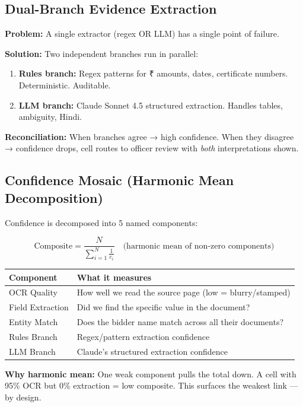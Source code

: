 \documentclass[11pt,a4paper]{article}
\begin{document}
\subsection{Dual-Branch Evidence Extraction}

\textbf{Problem:} A single extractor (regex OR LLM) has a single point of failure.

\textbf{Solution:} Two independent branches run in parallel:
\begin{enumerate}[nosep]
    \item \textbf{Rules branch:} Regex patterns for ₹ amounts, dates, certificate numbers. Deterministic. Auditable.
    \item \textbf{LLM branch:} Claude Sonnet 4.5 structured extraction. Handles tables, ambiguity, Hindi.
\end{enumerate}

\textbf{Reconciliation:} When branches agree → high confidence. When they disagree → confidence drops, cell routes to officer review with \textit{both} interpretations shown.

\subsection{Confidence Mosaic (Harmonic Mean Decomposition)}

Confidence is decomposed into 5 named components:

$$\text{Composite} = \frac{N}{\sum_{i=1}^{N} \frac{1}{c_i}} \quad \text{(harmonic mean of non-zero components)}$$

\begin{center}
\begin{tabular}{lp{8cm}}
\toprule
\textbf{Component} & \textbf{What it measures} \\
\midrule
OCR Quality & How well we read the source page (low = blurry/stamped) \\
Field Extraction & Did we find the specific value in the document? \\
Entity Match & Does the bidder name match across all their documents? \\
Rules Branch & Regex/pattern extraction confidence \\
LLM Branch & Claude's structured extraction confidence \\
\bottomrule
\end{tabular}
\end{center}

\textbf{Why harmonic mean:} One weak component pulls the total down. A cell with 95\% OCR but 0\% extraction = low composite. This surfaces the weakest link — by design.
\end{document}
